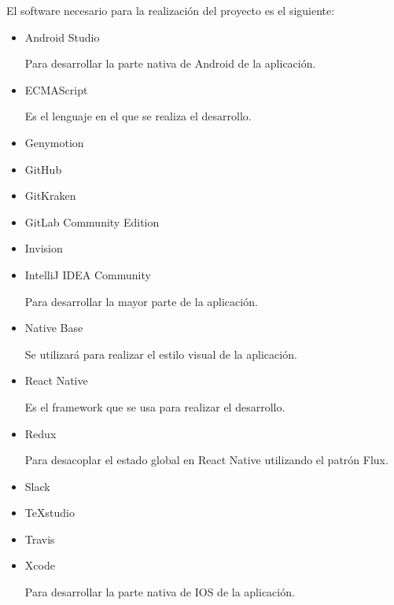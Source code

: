  El software necesario para la realización del proyecto es el siguiente:
\begin{itemize}
	\item Android Studio~\cite{ASTUDIO}
	
	Para desarrollar la parte nativa de Android de la aplicación.
	
	\item ECMAScript~\cite{ECMA}~\cite{ECMABOOK}
	
	Es el lenguaje en el que se realiza el desarrollo.
	
	\item Genymotion
	
	
	\item GitHub
	
	
	\item GitKraken
	
	
	\item GitLab Community Edition
	
	
	\item Invision
	
	
	\item IntelliJ IDEA Community~\cite{IDEA}
	
	Para desarrollar la mayor parte de la aplicación.
	
	\item Native Base~\cite{NABA}
	
	Se utilizará para realizar el estilo visual de la aplicación.
	
	\item React Native~\cite{RENA}~\cite{REACTBOOK}
	
	Es el framework que se usa para realizar el desarrollo.
	
	\item Redux~\cite{REDUX}
	
	Para desacoplar el estado global en React Native utilizando el patrón Flux.
	
	\item Slack
	
	
	\item TeXstudio
	
	
	\item Travis
	
	
	\item Xcode~\cite{XCODE}
	
	Para desarrollar la parte nativa de IOS de la aplicación.
\end{itemize}

